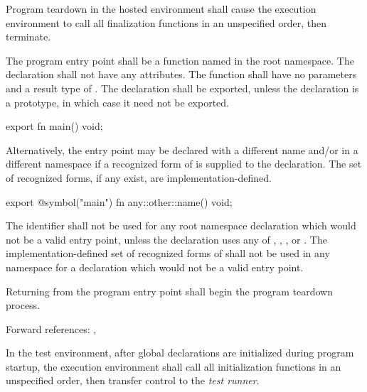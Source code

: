 \specsubsubitem
Program teardown in the hosted environment shall cause the execution environment
to call all finalization functions in an unspecified order, then terminate.

\specsubsubitem
The program entry point shall be a function named  in the root
namespace. The declaration shall not have any attributes. The function shall
have no parameters and a result type of . The declaration shall
be exported, unless the declaration is a prototype, in which case it need not be
exported.


\begin{codesample}
export fn main() void;
\end{codesample}


\specsubsubitem
Alternatively, the entry point may be declared with a different name and/or in a
different namespace if a recognized form of  is supplied to
the declaration. The set of recognized forms, if any exist, are
implementation-defined.


\begin{codesample}
export @symbol("main") fn any::other::name() void;
\end{codesample}

\specsubsubitem
The identifier  shall not be used for any root namespace declaration
which would not be a valid entry point, unless the declaration uses any of
, , , or .
The implementation-defined set of recognized forms of  shall
not be used in any namespace for a declaration which would not be a valid entry
point.

\specsubsubitem
Returning from the program entry point shall begin the program teardown process.

Forward references: , 


\specsubsubitem
In the test environment, after global declarations are initialized during
program startup, the execution environment shall call all initialization
functions in an unspecified order, then transfer control to the \textit{test
runner}.

